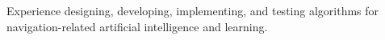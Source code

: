 Experience designing, developing, implementing, and testing algorithms for navigation-related artificial intelligence and learning.
